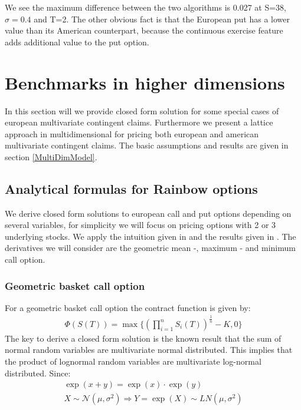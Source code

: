 We see the maximum difference between the two algorithms is 0.027 at S=38, $\sigma=0.4$ and T=2. The other obvious fact is that the European put has a lower value than its American counterpart, because the continuous exercise feature adds additional value to the put option. 



\section{Benchmarks in higher dimensions}\label{BMHiggerDim}
In this section will we provide closed form solution for some special cases of european multivariate contingent claims. Furthermore we present a lattice approach in multidimensional for pricing both european and american multivariate contingent claims. The basic assumptions and results are given in section \ref{MultiDimModel}.

\subsection{Analytical formulas for Rainbow options}
We derive closed form solutions to european call and put options depending on several variables, for simplicity we will focus on pricing options with 2 or 3 underlying stocks. We apply the intuition given in \parencite{Johnson87} and the results given in \parencite{Ouwehand2006}. The derivatives we will consider are the geometric mean -, maximum - and minimum call option.

\subsubsection{Geometric basket call option}
For a geometric basket call option the contract function is given by:
\begin{align*}
\Phi(S(T))=\max\{ (\prod_{i=1}^{n} S_i(T))^{\frac{1}{n}}-K,0 \}
\end{align*}
The key to  derive a closed form solution is the known result that the sum of normal random variables are multivariate normal distributed.
This implies that the product of lognormal random variables are multivariate log-normal distributed. Since: 
\begin{equation*}
\begin{split}
\exp(x+y)=\exp(x)\cdot \exp(y) \\
X \sim \mathcal{N}(\mu,\sigma^2) \Rightarrow Y = \exp(X)\sim LN(\mu, \sigma^2)
\end{split}
\end{equation*}

